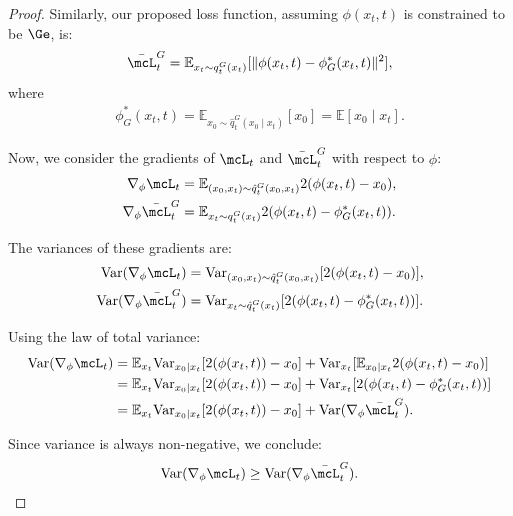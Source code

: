 \begin{proof}
Similarly, our proposed loss function, assuming \(\phi(x_t, t)\) is constrained to be \(\Ge\), is:
\begin{align*}
    \bar{\mcL}_t^G = \mathbb{E}_{x_t \sim q^G_t(x_t)} [\| \phi(x_t, t) - \phi^*_G(x_t, t) \|^2],
\end{align*}
where
\begin{align*}
    \phi^*_G(x_t, t) = \mathbb{E}_{x_0 \sim \hat{q}_t^G(x_0 \mid x_t)}[x_0] = \mathbb{E} [x_0 \mid x_t].
\end{align*}

Now, we consider the gradients of \(\mcL_t\) and \(\bar{\mcL}_t^G\) with respect to \(\phi\):
\begin{align*}
    \nabla_\phi \mcL_t &= \mathbb{E}_{(x_0, x_t) \sim \hat{q}^G_t(x_0, x_t)} 2(\phi(x_t, t) - x_0), \\
    \nabla_\phi \bar{\mcL}_t^G &= \mathbb{E}_{x_t \sim q^G_t(x_t)} 2(\phi(x_t, t) - \phi^*_G(x_t, t)).
\end{align*}

The variances of these gradients are:
\begin{align*}
    \text{Var}(\nabla_\phi \mcL_t) &= \text{Var}_{(x_0, x_t) \sim \hat{q}^G_t(x_0, x_t)} [2( \phi(x_t, t) - x_0 )], \\
    \text{Var}(\nabla_\phi \bar{\mcL}_t^G) &= \text{Var}_{x_t \sim \hat{q}^G_t(x_t)}[2(\phi(x_t, t) - \phi^*_G(x_t, t))].
\end{align*}

Using the law of total variance:
\begin{align*}
    \text{Var}(\nabla_\phi \mcL_t) &= \mathbb{E}_{x_t} \text{Var}_{x_0 \mid x_t} [2(\phi(x_t, t)) - x_0] + \text{Var}_{x_t} [\mathbb{E}_{x_0 \mid x_t}2(\phi(x_t, t) - x_0)] \\
    &= \mathbb{E}_{x_t} \text{Var}_{x_0 \mid x_t} [2(\phi(x_t, t)) - x_0] + \text{Var}_{x_t} [2(\phi(x_t, t) - \phi^*_G(x_t, t))] \\
    &= \mathbb{E}_{x_t} \text{Var}_{x_0 \mid x_t} [2(\phi(x_t, t)) - x_0] + \text{Var}(\nabla_\phi \bar{\mcL}_t^G).
\end{align*}

Since variance is always non-negative, we conclude:
\begin{align*}
    \text{Var}(\nabla_\phi \mcL_t) \geq \text{Var}(\nabla_\phi \bar{\mcL}_t^G).
\end{align*}
\end{proof}


